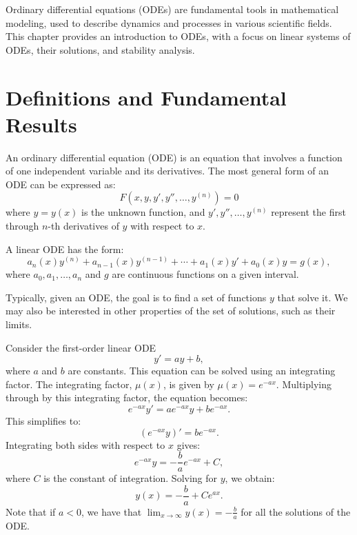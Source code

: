 Ordinary differential equations (ODEs) are fundamental tools in mathematical modeling, used to describe dynamics and processes in various scientific fields. This chapter provides an introduction to ODEs, with a focus on linear systems of ODEs, their solutions, and stability analysis.


\section{Definitions and Fundamental Results}
An ordinary differential equation (ODE) is an equation that involves a function of one independent variable and its derivatives. The most general form of an ODE can be expressed as:
\[
F(x, y, y', y'', \dots, y^{(n)}) = 0
\]
where $ y = y(x) $ is the unknown function, and $ y', y'', \dots, y^{(n)} $ represent the first through $ n $-th derivatives of $ y $ with respect to $ x $.

A linear ODE has the form:
\[
a_n(x) y^{(n)} + a_{n-1}(x) y^{(n-1)} + \cdots + a_1(x) y' + a_0(x) y = g(x),
\]
where $ a_0, a_1, \dots, a_n $ and $ g $ are continuous functions on a given interval.

Typically, given an ODE, the goal is to find a set of functions $y$ that solve it. We may also be interested in other properties of the set of solutions, such as their limits.

\begin{example}    
Consider the first-order linear ODE
\[
y' = ay + b,
\]
where $ a $ and $ b $ are constants. This equation can be solved using an integrating factor. The integrating factor, $ \mu(x) $, is given by $ \mu(x) = e^{-ax} $. Multiplying through by this integrating factor, the equation becomes:
\[
e^{-ax} y' = ae^{-ax} y + be^{-ax}.
\]
This simplifies to:
\[
(e^{-ax} y)' = be^{-ax}.
\]
Integrating both sides with respect to $ x $ gives:
\[
e^{-ax} y = -\frac{b}{a} e^{-ax} + C,
\]
where $ C $ is the constant of integration. Solving for $ y $, we obtain:
\[
y(x) = -\frac{b}{a} + Ce^{ax}.
\]
Note that if $a<0$, we have that $\lim_{x \to \infty} y(x) = -\frac{b}{a}$ for all the solutions of the ODE.
\end{example} 

